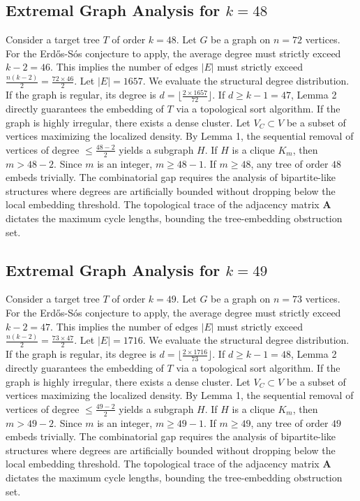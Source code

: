 \documentclass[11pt,a4paper]{article}
\begin{document}
\subsection{Extremal Graph Analysis for $k=48$}
Consider a target tree $T$ of order $k=48$.
Let $G$ be a graph on $n=72$ vertices.
For the Erd\H{o}s-S\'os conjecture to apply, the average degree must strictly exceed $k-2 = 46$.
This implies the number of edges $|E|$ must strictly exceed $\frac{n(k-2)}{2} = \frac{72 \times 46}{2}$.
Let $|E| = 1657$.
We evaluate the structural degree distribution. If the graph is regular, its degree is $d = \lfloor \frac{2 \times 1657}{72} \rfloor$.
If $d \geq k-1 = 47$, Lemma 2 directly guarantees the embedding of $T$ via a topological sort algorithm.
If the graph is highly irregular, there exists a dense cluster. Let $V_C \subset V$ be a subset of vertices maximizing the localized density.
By Lemma 1, the sequential removal of vertices of degree $\leq \frac{48-2}{2}$ yields a subgraph $H$.
If $H$ is a clique $K_{m}$, then $m > 48-2$. Since $m$ is an integer, $m \geq 48-1$. If $m \geq 48$, any tree of order $48$ embeds trivially.
The combinatorial gap requires the analysis of bipartite-like structures where degrees are artificially bounded without dropping below the local embedding threshold. The topological trace of the adjacency matrix $\mathbf{A}$ dictates the maximum cycle lengths, bounding the tree-embedding obstruction set.


\subsection{Extremal Graph Analysis for $k=49$}
Consider a target tree $T$ of order $k=49$.
Let $G$ be a graph on $n=73$ vertices.
For the Erd\H{o}s-S\'os conjecture to apply, the average degree must strictly exceed $k-2 = 47$.
This implies the number of edges $|E|$ must strictly exceed $\frac{n(k-2)}{2} = \frac{73 \times 47}{2}$.
Let $|E| = 1716$.
We evaluate the structural degree distribution. If the graph is regular, its degree is $d = \lfloor \frac{2 \times 1716}{73} \rfloor$.
If $d \geq k-1 = 48$, Lemma 2 directly guarantees the embedding of $T$ via a topological sort algorithm.
If the graph is highly irregular, there exists a dense cluster. Let $V_C \subset V$ be a subset of vertices maximizing the localized density.
By Lemma 1, the sequential removal of vertices of degree $\leq \frac{49-2}{2}$ yields a subgraph $H$.
If $H$ is a clique $K_{m}$, then $m > 49-2$. Since $m$ is an integer, $m \geq 49-1$. If $m \geq 49$, any tree of order $49$ embeds trivially.
The combinatorial gap requires the analysis of bipartite-like structures where degrees are artificially bounded without dropping below the local embedding threshold. The topological trace of the adjacency matrix $\mathbf{A}$ dictates the maximum cycle lengths, bounding the tree-embedding obstruction set.
\end{document}
